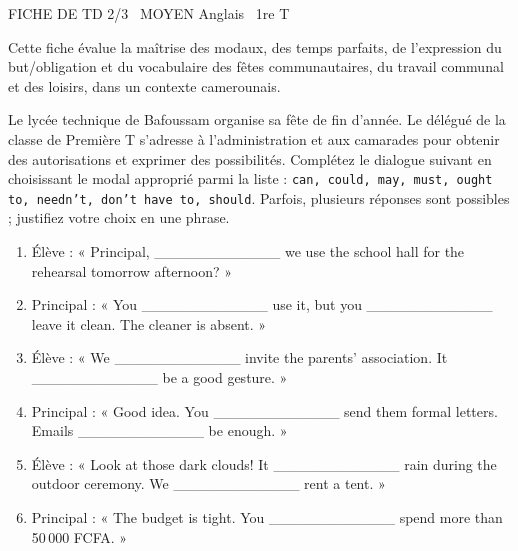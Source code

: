 \documentclass[11pt]{article}
\begin{document}
\begin{tcolorbox}[enhanced,colback=popink,colframe=popink,arc=10pt,boxrule=0pt,left=12pt,right=12pt,top=9pt,bottom=9pt]
{\color{white}\popxbold\small FICHE DE TD 2/3 \textbullet\ MOYEN \hfill Anglais \textbullet\ 1re T\par}
\end{tcolorbox}
\vspace{4pt}
Cette fiche évalue la maîtrise des modaux, des temps parfaits, de l'expression du but/obligation et du vocabulaire des fêtes communautaires, du travail communal et des loisirs, dans un contexte camerounais.

\begin{exercice}
Le lycée technique de Bafoussam organise sa fête de fin d'année. Le délégué de la classe de Première T s'adresse à l'administration et aux camarades pour obtenir des autorisations et exprimer des possibilités. Complétez le dialogue suivant en choisissant le modal approprié parmi la liste : \texttt{can, could, may, must, ought to, needn't, don't have to, should}. Parfois, plusieurs réponses sont possibles ; justifiez votre choix en une phrase.
\begin{enumerate}
    \item Élève : « Principal, \_\_\_\_\_\_\_\_\_\_\_\_ we use the school hall for the rehearsal tomorrow afternoon? »
    \item Principal : « You \_\_\_\_\_\_\_\_\_\_\_\_ use it, but you \_\_\_\_\_\_\_\_\_\_\_\_ leave it clean. The cleaner is absent. »
    \item Élève : « We \_\_\_\_\_\_\_\_\_\_\_\_ invite the parents' association. It \_\_\_\_\_\_\_\_\_\_\_\_ be a good gesture. »
    \item Principal : « Good idea. You \_\_\_\_\_\_\_\_\_\_\_\_ send them formal letters. Emails \_\_\_\_\_\_\_\_\_\_\_\_ be enough. »
    \item Élève : « Look at those dark clouds! It \_\_\_\_\_\_\_\_\_\_\_\_ rain during the outdoor ceremony. We \_\_\_\_\_\_\_\_\_\_\_\_ rent a tent. »
    \item Principal : « The budget is tight. You \_\_\_\_\_\_\_\_\_\_\_\_ spend more than 50\,000 FCFA. »
\end{enumerate}
\end{exercice}
\end{document}
